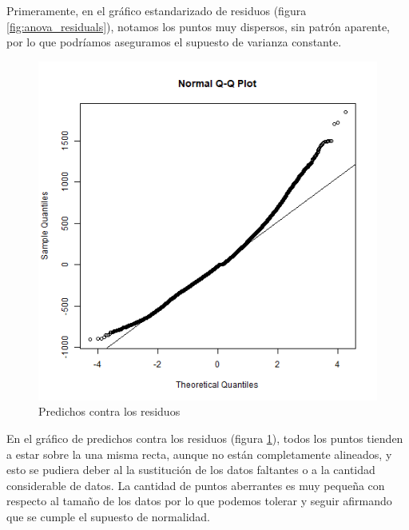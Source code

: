 \documentclass[a4paper,10pt,twocolumn]{article}
\begin{document}
 Primeramente, en el gr\'afico estandarizado de residuos (figura \ref{fig:anova_residuals}), notamos los puntos
 muy dispersos, sin patrón aparente, por lo que podríamos aseguramos el supuesto de varianza constante.
 
 \begin{figure}[h!]
 	\centering
 	\includegraphics[width=\linewidth]{Images/anova_std.png}
 	\caption{Predichos contra los residuos}
 	\label{fig:anova_qq}
 \end{figure}
 
 En el gr\'afico de predichos contra los residuos (figura \ref{fig:anova_qq}), todos los puntos tienden 
 a estar sobre la una misma recta, aunque no est\'an  completamente alineados, y esto se pudiera deber al la
 sustitución de los datos faltantes o a la cantidad considerable de datos. La cantidad de puntos aberrantes
 es muy peque\~na con respecto al tama\~no de los datos por lo que podemos tolerar y seguir afirmando que se cumple el supuesto de normalidad.
 
\end{document}
